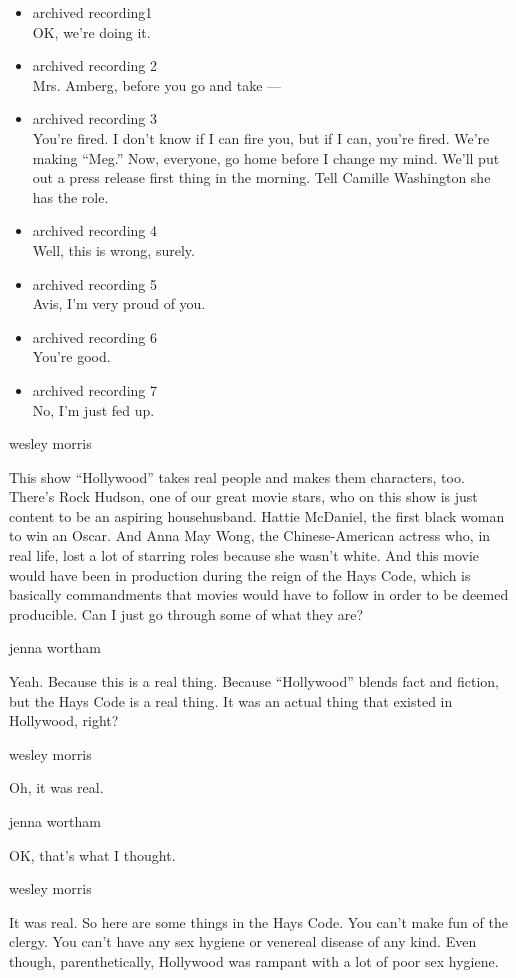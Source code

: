 \begin{itemize}
\item
  archived recording1\\
  OK, we're doing it.
\item
  archived recording 2\\
  Mrs. Amberg, before you go and take ---
\item
  archived recording 3\\
  You're fired. I don't know if I can fire you, but if I can, you're
  fired. We're making ``Meg.'' Now, everyone, go home before I change my
  mind. We'll put out a press release first thing in the morning. Tell
  Camille Washington she has the role.
\item
  archived recording 4\\
  Well, this is wrong, surely.
\item
  archived recording 5\\
  Avis, I'm very proud of you.
\item
  archived recording 6\\
  You're good.
\item
  archived recording 7\\
  No, I'm just fed up.
\end{itemize}

wesley morris

This show ``Hollywood'' takes real people and makes them characters,
too. There's Rock Hudson, one of our great movie stars, who on this show
is just content to be an aspiring househusband. Hattie McDaniel, the
first black woman to win an Oscar. And Anna May Wong, the
Chinese-American actress who, in real life, lost a lot of starring roles
because she wasn't white. And this movie would have been in production
during the reign of the Hays Code, which is basically commandments that
movies would have to follow in order to be deemed producible. Can I just
go through some of what they are?

jenna wortham

Yeah. Because this is a real thing. Because ``Hollywood'' blends fact
and fiction, but the Hays Code is a real thing. It was an actual thing
that existed in Hollywood, right?

wesley morris

Oh, it was real.

jenna wortham

OK, that's what I thought.

wesley morris

It was real. So here are some things in the Hays Code. You can't make
fun of the clergy. You can't have any sex hygiene or venereal disease of
any kind. Even though, parenthetically, Hollywood was rampant with a lot
of poor sex hygiene.

